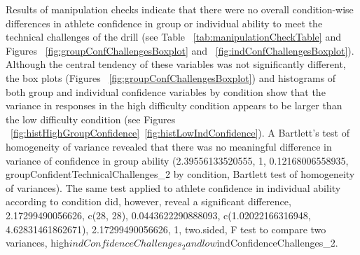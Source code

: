 \documentclass[english]{article}\usepackage[]{graphicx}\usepackage[]{color}
\makeatletter
\newenvironment{kframe}{%
 \def\at@end@of@kframe{}%
 \ifinner\ifhmode%
  \def\at@end@of@kframe{\end{minipage}}%
  \begin{minipage}{\columnwidth}%
 \fi\fi%
 \def\FrameCommand##1{\hskip\@totalleftmargin \hskip-\fboxsep
 \colorbox{shadecolor}{##1}\hskip-\fboxsep
     \hskip-\linewidth \hskip-\@totalleftmargin \hskip\columnwidth}%
 \MakeFramed {\advance\hsize-\width
   \@totalleftmargin\z@ \linewidth\hsize
   \@setminipage}}%
 {\par\unskip\endMakeFramed%
 \at@end@of@kframe}
\newenvironment{knitrout}{}{} %
\makeatother
\begin{document}
\begin{knitrout}
\color{fgcolor}\begin{kframe}


{\ttfamily\noindent\bfseries{}}

{\ttfamily\noindent\bfseries{}}

{\ttfamily\noindent\bfseries\color{errorcolor}{\#\# Error in apa(indPerfBartlett): Unkown type passed to 'x'}}\end{kframe}
\end{knitrout}

Results of manipulation checks indicate that there were no overall condition-wise differences in athlete confidence in group or individual ability to meet the technical challenges of the drill (see Table ~\ref{tab:manipulationCheckTable} and Figures ~\ref{fig:groupConfChallengesBoxplot} and ~\ref{fig:indConfChallengesBoxplot}).
Although the central tendency of these variables was not significantly different, the box plots (Figures ~\ref{fig:groupConfChallengesBoxplot}) and histograms of both group and individual confidence variables by condition show that the variance in responses in the high difficulty condition appears to be larger than the low difficulty condition (see Figures ~\ref{fig:histHighGroupConfidence}\nobreakdash~\ref{fig:histLowIndConfidence}).
A Bartlett's test of homogeneity of variance revealed that there was no meaningful difference in variance of confidence in group ability (2.39556133520555, 1, 0.12168006558935, groupConfidentTechnicalChallenges_2 by condition, Bartlett test of homogeneity of variances). The same test applied to athlete confidence in individual ability according to condition did, however, reveal a significant difference, 2.17299490056626, c(28, 28), 0.0443622290888093, c(1.02022166316948, 4.62831461862671), 2.17299490056626, 1, two.sided, F test to compare two variances, high$indConfidenceChallenges_2 and low$indConfidenceChallenges_2.
\end{document}
